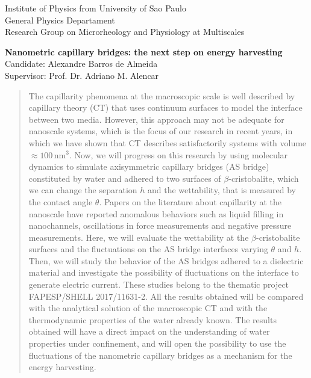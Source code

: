 \begin{titlepage}

\centering
\large{Institute of Physics from University of Sao Paulo\\General Physics Departament\\Research Group on Microrheology and Physiology at Multiscales}

\Large{\bf Nanometric capillary bridges: the next step on energy harvesting}\\
\vspace{1cm}
\normalsize{Candidate: Alexandre Barros de Almeida}\\
\normalsize{Supervisor: Prof. Dr. Adriano M. Alencar}\\



\begin{quotation}
\noindent 
The capillarity phenomena at the macroscopic scale is well described by capillary theory (CT) that uses continuum surfaces to model the interface between two media.  
However, this approach may not be adequate for nanoscale systems, which is the focus of our research in recent years, in which we have shown that CT describes satisfactorily systems with volume $\approx100$\,nm$^3$.
Now, we will progress on this research by using molecular dynamics to simulate axisymmetric capillary bridges (AS bridge) constituted by water and adhered to two surfaces of $\beta$-cristobalite, which we can change the separation $h$ and the wettability, that is measured by the contact angle $\theta$.
Papers on the literature about capillarity at the nanoscale have reported anomalous behaviors such as liquid filling in nanochannels, oscillations in force measurements and negative pressure measurements.
Here, we will evaluate the wettability at the $\beta$-cristobalite surfaces and the fluctuations on the AS bridge interfaces varying $\theta$ and $h$.
Then, we will study the behavior of the AS bridges adhered to a dielectric material and investigate the possibility of fluctuations on the interface to generate electric current.
These studies belong to the thematic project FAPESP/SHELL 2017/11631-2.
All the results obtained will be compared with the analytical solution of the macroscopic CT and with the thermodynamic properties of the water already known.
The results obtained will have a direct impact on the understanding of water properties under confinement, and will open the possibility to use the fluctuations of the nanometric capillary bridges as a mechanism for the energy harvesting.
\end{quotation}

\end{titlepage}

